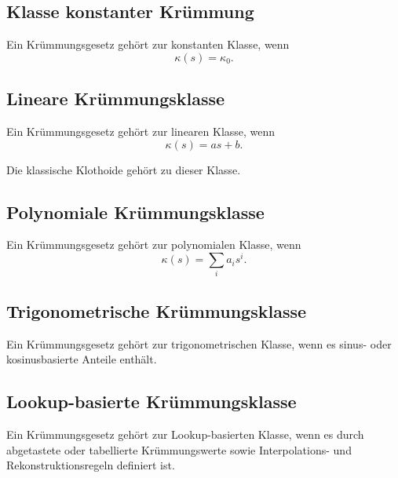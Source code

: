 \subsection{Klasse konstanter Krümmung}
\begin{definition}
\label{def:constant-curvature-classification}
Ein Krümmungsgesetz gehört zur konstanten Klasse, wenn
\[
\kappa(s)=\kappa_0.
\]
\end{definition}

\subsection{Lineare Krümmungsklasse}
\begin{definition}
\label{def:linear-curvature-class}
Ein Krümmungsgesetz gehört zur linearen Klasse, wenn
\[
\kappa(s)=a s+b.
\]
\end{definition}
Die klassische Klothoide gehört zu dieser Klasse.

\subsection{Polynomiale Krümmungsklasse}
\begin{definition}
\label{def:polynomial-curvature-class}
Ein Krümmungsgesetz gehört zur polynomialen Klasse, wenn
\[
\kappa(s)=\sum_i a_i s^i.
\]
\end{definition}

\subsection{Trigonometrische Krümmungsklasse}
\begin{definition}
\label{def:trigonometric-curvature-class}
Ein Krümmungsgesetz gehört zur trigonometrischen Klasse, wenn es sinus- oder
kosinusbasierte Anteile enthält.
\end{definition}

\subsection{Lookup-basierte Krümmungsklasse}
\begin{definition}
\label{def:lookup-curvature-class}
Ein Krümmungsgesetz gehört zur Lookup-basierten Klasse, wenn es durch
abgetastete oder tabellierte Krümmungswerte sowie Interpolations- und
Rekonstruktionsregeln definiert ist.
\end{definition}

